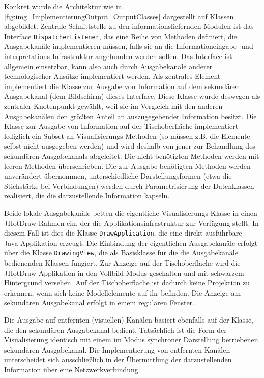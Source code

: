 Konkret wurde die Architektur wie in \ref{fig:img_ImplementierungOutput_OutputClasses} dargestellt auf Klassen abgebildet. Zentrale Schnittstelle zu den informationsliefernden Modulen ist das Interface \texttt{DispatcherListener}, das eine Reihe von Methoden definiert, die Ausgabekanäle implementieren müssen, falls sie an die Informationeingabe- und -interpretations-Infrastruktur angebunden werden sollen. Das Interface ist allgemein einsetzbar, kann also auch durch Ausgabekanäle anderer technologischer Ansätze implementiert werden. Als zentrales Element implementiert die Klasse zur Ausgabe von Information auf dem sekundären Ausgabekanal (dem Bildschirm) dieses Interface. Diese Klasse wurde deswegen als zentraler Knotenpunkt gewählt, weil sie im Vergleich mit den anderen Ausgabekanälen den größten Anteil an auszugegebender Information besitzt. Die Klasse zur Ausgabe von Information auf der Tischoberfläche implementiert lediglich ein Subset an Visualisierungs-Methoden (so müssen z.B. die Elemente selbst nicht ausgegeben werden) und wird deshalb von jener zur Behandlung des sekundären Ausgabekanals abgeleitet. Die nicht benötigten Methoden werden mit leeren Methoden überschrieben. Die zur Ausgabe benötigten Methoden werden unverändert übernommen, unterschiedliche Darstellungsformen (etwa die Stichstärke bei Verbindungen) werden durch Parametrisierung der Datenklassen realisiert, die die darzustellende Information kapseln.

Beide lokale Ausgabekanäle betten die eigentliche Visualisierungs-Klasse in einen JHotDraw-Rahmen ein, der die Applikationsinfrastruktur zur Verfügung stellt. In diesem Fall ist dies die Klasse \texttt{DrawApplication}, die eine direkt ausführbare Java-Applikation erzeugt. Die Einbindung der eigentlichen Ausgabekanäle erfolgt über die Klasse \texttt{DrawingView}, die als Basisklasse für die die Ausgabekanäle bedienenden Klassen fungiert. Zur Anzeige auf der Tischoberfläche wird die JHotDraw-Applikation in den Vollbild-Modus geschalten und mit schwarzem Hintergrund versehen. Auf der Tischoberfläche ist dadurch keine Projektion zu erkennen, wenn sich keine Modellelemente auf ihr befinden. Die Anzeige am sekundären Ausgabekanal erfolgt in einem regulären Fenster.

Die Ausgabe auf entfernten (visuellen) Kanälen basiert ebenfalls auf der Klasse, die den sekundären Ausgabekanal bedient. Tatsächlich ist die Form der Visualisierung identisch mit einem im Modus synchroner Darstellung betriebenen sekundären Ausgabekanal. Die Implementierung von entfernten Kanälen unterscheidet sich ausschließlich in der Übermittlung der darzustellenden Information über eine Netzwerkverbindung. 

